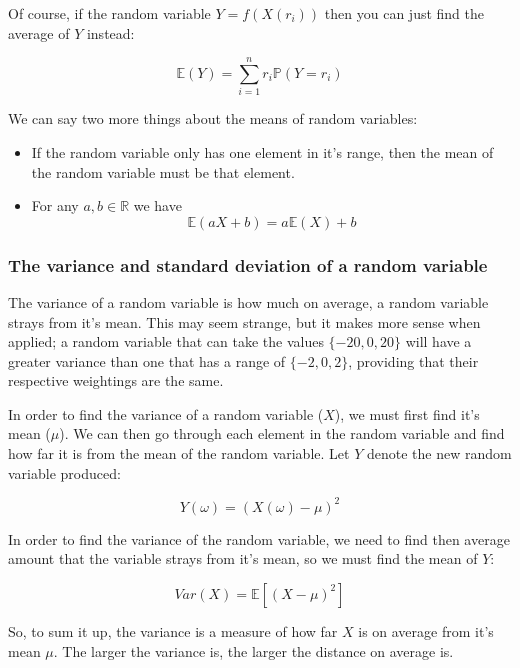 Of course, if the random variable $Y = f(X(r_i))$ then you can just find
the average of $Y$ instead:

\begin{dmath*}
	\mathbb{E}(Y) = {\sum\limits_{i=1}^{n} r_i \mathbb{P}(Y = r_i)}
\end{dmath*}

We can say two more things about the means of random variables:

\begin{itemize}
	\item If the random variable only has one element in it's range, then the mean of the random variable must be that element.
	\item For any $a, b \in \mathbb{R}$ we have
	\begin{dmath*}
		\mathbb{E}(aX + b) = a\mathbb{E}(X) + b
	\end{dmath*}
\end{itemize}

\subsubsection{The variance and standard deviation of a random variable}

The variance of a random variable is how much on average, a random variable
strays from it's mean. This may seem strange, but it makes more sense when
applied; a random variable that can take the values $\{-20, 0, 20\}$ will have
a greater variance than one that has a range of $\{-2, 0, 2\}$, providing that
their respective weightings are the same.

In order to find the variance of a random variable ($X$), we must first find
it's mean ($\mu$). We can then go through each element in the random variable
and find how far it is from the mean of the random variable. Let $Y$ denote
the new random variable produced:

\begin{dmath*}
	Y(\omega) = (X(\omega) - \mu)^2
\end{dmath*}

In order to find the variance of the random variable, we need to find then
average amount that the variable strays from it's mean, so we must find the
mean of $Y$:

\begin{dmath*}
	Var(X) = \mathbb{E}[(X - \mu)^2]
\end{dmath*}

So, to sum it up, the variance is a measure of how far $X$ is on average from
it's mean $\mu$. The larger the variance is, the larger the distance on
average is.

